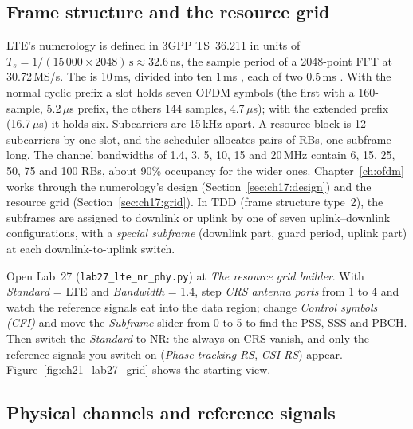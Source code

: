 \subsection{Frame structure and the resource grid}

LTE's numerology is defined in 3GPP TS~36.211 in units of
$T_s=1/(15\,000\times2048)\,\mathrm{s}\approx32.6$\,ns, the sample period of a 2048-point FFT at
30.72\,MS/s. The  is 10\,ms, divided into ten 1\,ms , each of two
0.5\,ms . With the normal cyclic prefix a slot holds seven OFDM symbols (the first with a
160-sample, 5.2\,$\mu$s prefix, the others 144 samples, 4.7\,$\mu$s); with the extended prefix
(16.7\,$\mu$s) it holds six. Subcarriers are 15\,kHz apart. A resource block is 12 subcarriers by one
slot, and the scheduler allocates pairs of RBs, one subframe long. The channel bandwidths of 1.4, 3,
5, 10, 15 and 20\,MHz contain 6, 15, 25, 50, 75 and 100 RBs, about 90\% occupancy for the wider ones.
Chapter~\ref{ch:ofdm} works through the numerology's design (Section~\ref{sec:ch17:design}) and the
resource grid (Section~\ref{sec:ch17:grid}). In TDD (frame structure type~2), the subframes are
assigned to downlink or uplink by one of seven uplink--downlink configurations, with a \emph{special
subframe} (downlink part, guard period, uplink part) at each downlink-to-uplink switch.

\begin{tryit}
Open Lab~27 (\texttt{lab27\_lte\_nr\_phy.py}) at \emph{The resource grid builder}. With
\emph{Standard} = LTE and \emph{Bandwidth} = 1.4, step \emph{CRS antenna ports} from 1 to 4 and watch
the reference signals eat into the data region; change \emph{Control symbols (CFI)} and move the
\emph{Subframe} slider from 0 to 5 to find the PSS, SSS and PBCH. Then switch the \emph{Standard} to
NR: the always-on CRS vanish, and only the reference signals you switch on (\emph{Phase-tracking RS},
\emph{CSI-RS}) appear. Figure~\ref{fig:ch21_lab27_grid} shows the starting view.
\end{tryit}

\subsection{Physical channels and reference signals}

